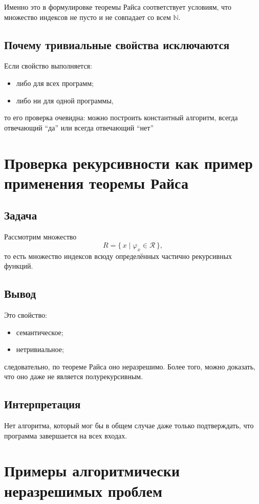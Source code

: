 \documentclass[12pt,a4paper]{article}
\begin{document}
Именно это в формулировке теоремы Райса соответствует условиям, что множество индексов не пусто и не совпадает со всем $\mathbb N$.

\subsection{Почему тривиальные свойства исключаются}
Если свойство выполняется:
\begin{itemize}
    \item либо для всех программ;
    \item либо ни для одной программы,
\end{itemize}
то его проверка очевидна: можно построить константный алгоритм, всегда отвечающий ``да'' или всегда отвечающий ``нет''

\section{Проверка рекурсивности как пример применения теоремы Райса}

\subsection{Задача}
Рассмотрим множество
\[
R=\{\,x\mid \varphi_x\in\mathcal R\,\},
\]
то есть множество индексов всюду определённых частично рекурсивных функций.

\subsection{Вывод}
Это свойство:
\begin{itemize}
    \item семантическое;
    \item нетривиальное;
\end{itemize}
следовательно, по теореме Райса оно неразрешимо. Более того, можно доказать, что оно даже не является полурекурсивным.

\subsection{Интерпретация}
Нет алгоритма, который мог бы в общем случае даже только подтверждать, что программа завершается на всех входах.

\section{Примеры алгоритмически неразрешимых проблем}
\end{document}
